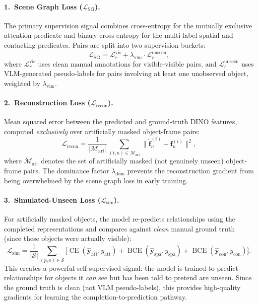 \documentclass{article}
\newcommand{\op}[1]{\operatorname{#1}}
\newcommand{\mat}[1]{\bm{#1}}
\begin{document}
\paragraph{1.\ Scene Graph Loss ($\mathcal{L}_{\text{SG}}$).}  The primary supervision signal combines cross-entropy for the mutually exclusive attention predicate and binary cross-entropy for the multi-label spatial and contacting predicates.  Pairs are split into two supervision buckets:
\begin{equation}
    \mathcal{L}_{\text{SG}} = \mathcal{L}_{r}^{\text{vis}} + \lambda_{\text{vlm}} \cdot \mathcal{L}_{r}^{\text{unseen}},
    \label{eq:sg_loss}
\end{equation}
where $\mathcal{L}_{r}^{\text{vis}}$ uses clean manual annotations for visible-visible pairs, and $\mathcal{L}_{r}^{\text{unseen}}$ uses VLM-generated pseudo-labels for pairs involving at least one unobserved object, weighted by $\lambda_{\text{vlm}}$.

\paragraph{2.\ Reconstruction Loss ($\mathcal{L}_{\text{recon}}$).}  Mean squared error between the predicted and ground-truth DINO features, computed \emph{exclusively} over artificially masked object-frame pairs:
\begin{equation}
    \mathcal{L}_{\text{recon}} = \frac{1}{|\mathcal{M}_{\text{art}}|}\sum_{(t,n) \in \mathcal{M}_{\text{art}}} \|\hat{\mat{f}}_n^{(t)} - \mat{f}_n^{(t)}\|^2,
    \label{eq:recon_loss}
\end{equation}
where $\mathcal{M}_{\text{art}}$ denotes the set of artificially masked (not genuinely unseen) object-frame pairs.  The dominance factor $\lambda_{\text{dom}}$ prevents the reconstruction gradient from being overwhelmed by the scene graph loss in early training.

\paragraph{3.\ Simulated-Unseen Loss ($\mathcal{L}_{\text{sim}}$).}  For artificially masked objects, the model re-predicts relationships using the completed representations and compares against \emph{clean} manual ground truth (since these objects were actually visible):
\begin{equation}
    \mathcal{L}_{\text{sim}} = \frac{1}{|\mathcal{S}|}\sum_{(p,o) \in \mathcal{S}} \bigl[\op{CE}(\hat{\mat{y}}_{\text{att}}, y_{\text{att}}) + \op{BCE}(\hat{\mat{y}}_{\text{spa}}, y_{\text{spa}}) + \op{BCE}(\hat{\mat{y}}_{\text{con}}, y_{\text{con}})\bigr].
    \label{eq:sim_loss}
\end{equation}
This creates a powerful self-supervised signal: the model is trained to predict relationships for objects it \emph{can} see but has been told to pretend are unseen.  Since the ground truth is clean (not VLM pseudo-labels), this provides high-quality gradients for learning the completion-to-prediction pathway.
\end{document}
